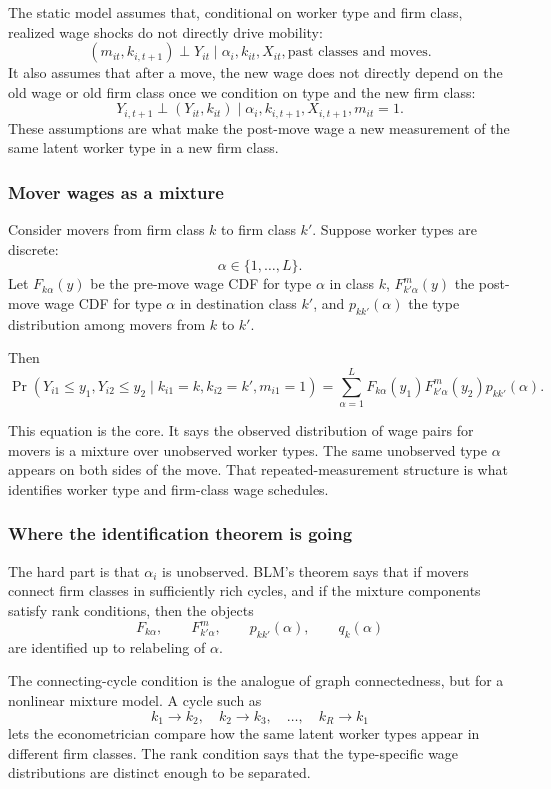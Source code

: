 \documentclass[11pt]{article}
\newcommand{\1}{\mathbf{1}}
\begin{document}
The static model assumes that, conditional on worker type and firm class, realized wage shocks do not directly drive mobility:
\[
(m_{it},k_{i,t+1})
\perp
Y_{it}
\mid
\alpha_i,k_{it},X_{it},\text{past classes and moves}.
\]
It also assumes that after a move, the new wage does not directly depend on the old wage or old firm class once we condition on type and the new firm class:
\[
Y_{i,t+1}
\perp
(Y_{it},k_{it})
\mid
\alpha_i,k_{i,t+1},X_{i,t+1},m_{it}=1.
\]
These assumptions are what make the post-move wage a new measurement of the same latent worker type in a new firm class.

\subsubsection*{Mover wages as a mixture}

Consider movers from firm class $k$ to firm class $k'$. Suppose worker types are discrete:
\[
\alpha\in\{1,\ldots,L\}.
\]
Let $F_{k\alpha}(y)$ be the pre-move wage CDF for type $\alpha$ in class $k$, $F^m_{k'\alpha}(y)$ the post-move wage CDF for type $\alpha$ in destination class $k'$, and $p_{kk'}(\alpha)$ the type distribution among movers from $k$ to $k'$.

Then
\[
\boxed{
\Pr(Y_{i1}\leq y_1,Y_{i2}\leq y_2
\mid k_{i1}=k,k_{i2}=k',m_{i1}=1)
=
\sum_{\alpha=1}^L
F_{k\alpha}(y_1)F^m_{k'\alpha}(y_2)p_{kk'}(\alpha).
}
\]

This equation is the core. It says the observed distribution of wage pairs for movers is a mixture over unobserved worker types. The same unobserved type $\alpha$ appears on both sides of the move. That repeated-measurement structure is what identifies worker type and firm-class wage schedules.

\subsubsection*{Where the identification theorem is going}

The hard part is that $\alpha_i$ is unobserved. BLM's theorem says that if movers connect firm classes in sufficiently rich cycles, and if the mixture components satisfy rank conditions, then the objects
\[
F_{k\alpha},\qquad F^m_{k'\alpha},\qquad p_{kk'}(\alpha),\qquad q_k(\alpha)
\]
are identified up to relabeling of $\alpha$.

The connecting-cycle condition is the analogue of graph connectedness, but for a nonlinear mixture model. A cycle such as
\[
k_1\to k_2,\quad k_2\to k_3,\quad \ldots,\quad k_R\to k_1
\]
lets the econometrician compare how the same latent worker types appear in different firm classes. The rank condition says that the type-specific wage distributions are distinct enough to be separated.
\end{document}
